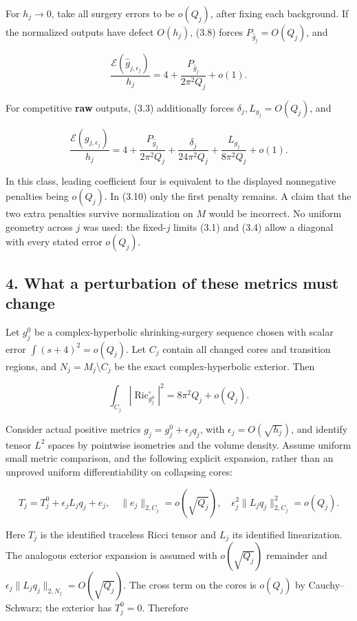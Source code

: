 \documentclass[
  10pt,
]{article}
\begin{document}
For \(h_j\to0\), take all surgery errors to be \(o(Q_j)\), after fixing
each background. If the normalized outputs have defect \(O(h_j)\), (3.8)
forces \(P_{\widehat g_j}=O(Q_j)\), and

\[
 \boxed{\frac{\mathcal E(\widehat g_{j,\epsilon_j})}{h_j}
 =4+\frac{P_{\widehat g_j}}{2\pi^2Q_j}+o(1).} \tag{3.10}
\]

For competitive \textbf{raw} outputs, (3.3) additionally forces
\(\delta_j,L_{g_j}=O(Q_j)\), and

\[
 \frac{\mathcal E(g_{j,\epsilon_j})}{h_j}
 =4+\frac{P_{\widehat g_j}}{2\pi^2Q_j}
      +\frac{\delta_j}{24\pi^2Q_j}
      +\frac{L_{g_j}}{8\pi^2Q_j}+o(1). \tag{3.11}
\]

In this class, leading coefficient four is equivalent to the displayed
nonnegative penalties being \(o(Q_j)\). In (3.10) only the first penalty
remains. A claim that the two extra penalties survive normalization on
\(M\) would be incorrect. No uniform geometry across \(j\) was used: the
fixed-\(j\) limits (3.1) and (3.4) allow a diagonal with every stated
error \(o(Q_j)\).

\hypertarget{what-a-perturbation-of-these-metrics-must-change}{%
\subsection{4. What a perturbation of these metrics must
change}\label{what-a-perturbation-of-these-metrics-must-change}}

Let \(g_j^0\) be a complex-hyperbolic shrinking-surgery sequence chosen
with scalar error \(\int(s+4)^2=o(Q_j)\). Let \(C_j\) contain all
changed cores and transition regions, and \(N_j=M_j\setminus C_j\) be
the exact complex-hyperbolic exterior. Then

\[
 \int_{C_j}|\operatorname{Ric}_{g_j^0}^{\circ}|^2
                    =8\pi^2Q_j+o(Q_j).
\]

Consider actual positive metrics \(g_j=g_j^0+\epsilon_j q_j\), with
\(\epsilon_j=O(\sqrt{h_j})\), and identify tensor \(L^2\) spaces by
pointwise isometries and the volume density. Assume uniform small metric
comparison, and the following explicit expansion, rather than an
unproved uniform differentiability on collapsing cores:

\[
 T_j=T_j^0+\epsilon_j L_jq_j+e_j,\quad
 \|e_j\|_{2,C_j}=o(\sqrt{Q_j}),
 \quad\epsilon_j^2\|L_jq_j\|_{2,C_j}^2=o(Q_j).
 \tag{4.1}
\]

Here \(T_j\) is the identified traceless Ricci tensor and \(L_j\) its
identified linearization. The analogous exterior expansion is assumed
with \(o(\sqrt{Q_j})\) remainder and
\(\epsilon_j\|L_jq_j\|_{2,N_j}=O(\sqrt{Q_j})\). The cross term on the
cores is \(o(Q_j)\) by Cauchy--Schwarz; the exterior has \(T_j^0=0\).
Therefore
\end{document}
